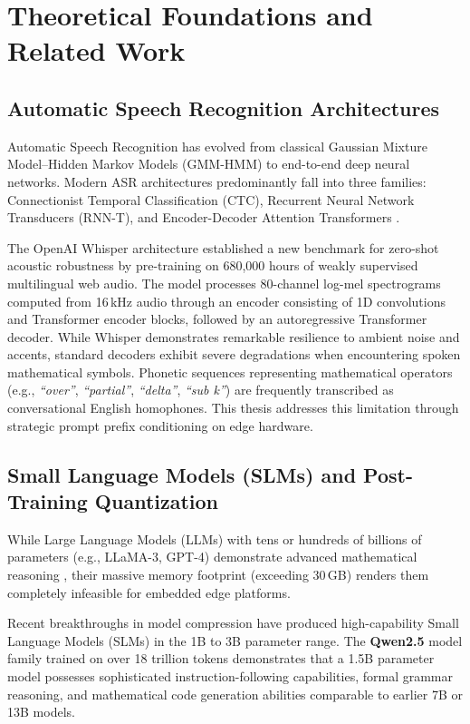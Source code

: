 \documentclass[11pt,a4paper,oneside]{report}
\begin{document}
\chapter{Theoretical Foundations and Related Work}
\label{chap:lit_review}

\section{Automatic Speech Recognition Architectures}
Automatic Speech Recognition has evolved from classical Gaussian Mixture Model--Hidden Markov Models (GMM-HMM) to end-to-end deep neural networks. Modern ASR architectures predominantly fall into three families: Connectionist Temporal Classification (CTC), Recurrent Neural Network Transducers (RNN-T), and Encoder-Decoder Attention Transformers \cite{vaswani2017attention}.

The OpenAI Whisper architecture \cite{radford2023robust} established a new benchmark for zero-shot acoustic robustness by pre-training on 680,000 hours of weakly supervised multilingual web audio. The model processes 80-channel log-mel spectrograms computed from 16\,kHz audio through an encoder consisting of 1D convolutions and Transformer encoder blocks, followed by an autoregressive Transformer decoder. While Whisper demonstrates remarkable resilience to ambient noise and accents, standard decoders exhibit severe degradations when encountering spoken mathematical symbols. Phonetic sequences representing mathematical operators (e.g., \textit{``over''}, \textit{``partial''}, \textit{``delta''}, \textit{``sub k''}) are frequently transcribed as conversational English homophones. This thesis addresses this limitation through strategic prompt prefix conditioning on edge hardware.

\section{Small Language Models (SLMs) and Post-Training Quantization}
While Large Language Models (LLMs) with tens or hundreds of billions of parameters (e.g., LLaMA-3, GPT-4) demonstrate advanced mathematical reasoning \cite{touvron2023llama}, their massive memory footprint (exceeding 30\,GB) renders them completely infeasible for embedded edge platforms.

Recent breakthroughs in model compression have produced high-capability Small Language Models (SLMs) in the 1B to 3B parameter range. The \textbf{Qwen2.5} model family \cite{qwen2024} trained on over 18 trillion tokens demonstrates that a 1.5B parameter model possesses sophisticated instruction-following capabilities, formal grammar reasoning, and mathematical code generation abilities comparable to earlier 7B or 13B models.
\end{document}
